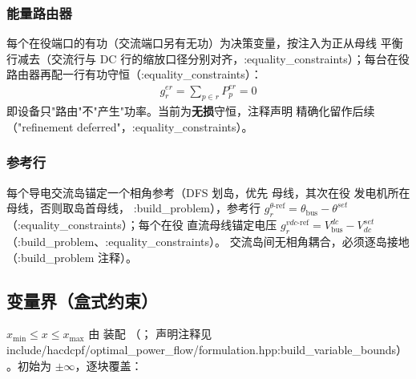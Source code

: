 \subsubsection*{能量路由器}
每个在役端口的有功（交流端口另有无功）为决策变量，按注入为正从母线
平衡行减去（交流行与 DC 行的缩放口径分别对齐，:equality\_constraints）；每台在役
路由器再配一行有功守恒（:equality\_constraints）：
\begin{align*}
g^{er}_r=\sum_{p\in r}P^{er}_p=0
\end{align*}
即设备只"路由"不"产生"功率。当前为\textbf{无损}守恒，注释声明
 精确化留作后续（"refinement deferred"，:equality\_constraints）。

\subsubsection*{参考行}
每个导电交流岛锚定一个相角参考（DFS 划岛，优先 
母线，其次在役  发电机所在母线，否则取岛首母线，
:build\_problem），参考行 $g^{\theta\text{-ref}}_r=\theta_{\mathrm{bus}}-\theta^{set}$
（:equality\_constraints）；每个在役  直流母线锚定电压
$g^{vdc\text{-ref}}_r=V^{dc}_{\mathrm{bus}}-V^{set}_{dc}$（:build\_problem、:equality\_constraints）。
交流岛间无相角耦合，必须逐岛接地（:build\_problem 注释）。

\subsection{变量界（盒式约束）}

$x_{\min}\le x\le x_{\max}$ 由  装配
（；
声明注释见 include/hacdcpf/optimal\_power\_flow/formulation.hpp:build\_variable\_bounds）。初始为 $\pm\infty$，逐块覆盖：

